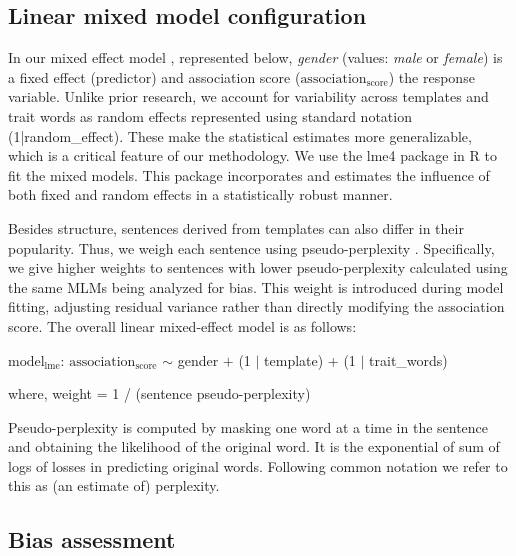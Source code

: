 \subsection{Linear mixed model configuration} \label{model-configuration}

\noindent 
In our mixed effect model \cite{baayen2008mixed}, represented below, \textit{gender} (values: \textit{male} or \textit{female}) is a fixed effect (predictor) and association score ($\text{association}_{\text{score}}$) the response variable.
%
Unlike prior research, we account for  variability across  templates and trait words
as random effects represented using standard notation (1|random\_effect).
%
These make the statistical estimates more generalizable, which is a critical feature of our methodology. We use the lme4 \cite{lme4} package in R to fit the mixed models.
%
This package incorporates and estimates the influence of both fixed and random effects in a statistically robust manner.


Besides structure, sentences derived from templates can also differ in their popularity. Thus, we weigh each sentence using pseudo-perplexity \cite{salazar-etal-2020-masked}.
%
Specifically, we give higher weights to sentences with lower pseudo-perplexity calculated using the same MLMs being analyzed for bias.
%
This weight is introduced during model fitting, adjusting residual variance rather than directly modifying the association score. The overall linear mixed-effect model is as follows:

\vspace{0.5em}

\noindent $\text{model}_{\text{lme}}$: $\text{association}_{\text{score}}$ $\sim$ gender $+$ (1 $|$ template) + (1 $|$ trait\_words)

\vspace{0.2em}
where, weight = 1 / (sentence pseudo-perplexity)

\vspace{0.5em}
Pseudo-perplexity is computed by masking one word at a time in the sentence and obtaining the likelihood of the original word. It is the exponential of sum of logs of losses in predicting original words. Following common notation we refer to this as (an estimate of) perplexity. 
 
\subsection{Bias assessment}\label{bias-assessment}

